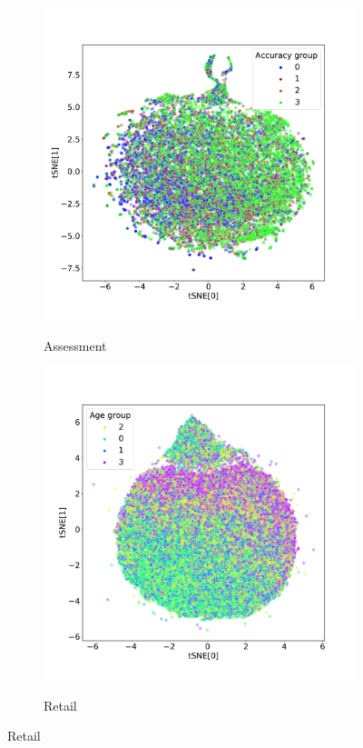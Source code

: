 \documentclass[sigconf]{acmart}
\begin{document}
\begin{figure}
\begin{subfigure}{0.5\textwidth}
    \label{fig-tsne-churn}
  \end{subfigure}
  \begin{subfigure}{0.5\textwidth}
    \caption{Assessment}
    \includegraphics[width=\textwidth]{figures/iclr-bowl-tsne-accuracy_group.pdf}
    \label{fig-tsne-bowl}
  \end{subfigure}%
  \begin{subfigure}{0.5\textwidth}
    \caption{Retail}
    \includegraphics[width=\textwidth]{figures/iclr-x5-tsne-age_bin.pdf}
    \label{fig-tsne-x5}
  \end{subfigure}
\end{figure}

\fi

\clearpage
\end{document}
